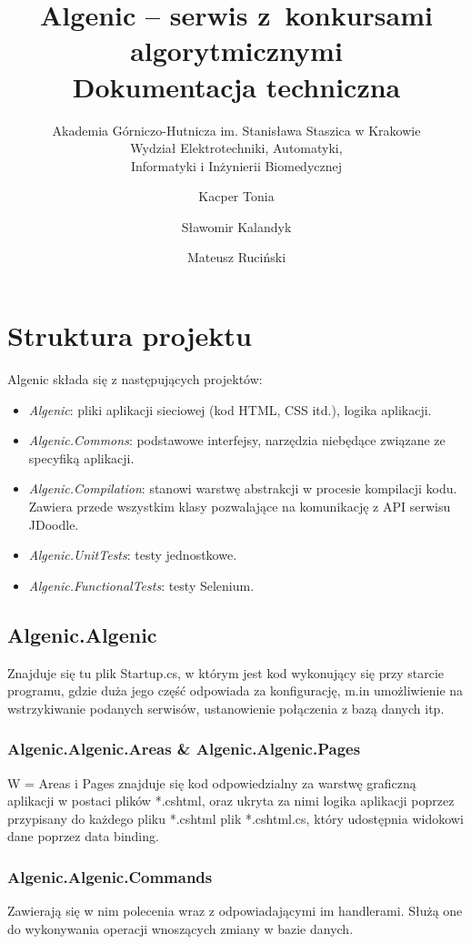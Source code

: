 \documentclass{article}
\title{Algenic -- serwis z~konkursami algorytmicznymi\\
    Dokumentacja techniczna}
\subtitle{Akademia Górniczo-Hutnicza im. Stanisława Staszica w Krakowie\\
	Wydział Elektrotechniki, Automatyki,\\
	Informatyki i Inżynierii Biomedycznej}
\author{Kacper Tonia\and
		Sławomir Kalandyk\and
		Mateusz Ruciński}
\date{}
\begin{document}
\maketitle

\section{Struktura projektu}
Algenic składa się z następujących projektów:
\begin{itemize}
    \item \textit{Algenic}: pliki aplikacji sieciowej (kod HTML, CSS itd.), logika aplikacji.
    \item \textit{Algenic.Commons}: podstawowe interfejsy, narzędzia niebędące związane ze specyfiką aplikacji.
    \item \textit{Algenic.Compilation}: stanowi warstwę abstrakcji w procesie kompilacji kodu. Zawiera przede wszystkim klasy pozwalające na komunikację z API serwisu JDoodle.
    \item \textit{Algenic.UnitTests}: testy jednostkowe.
    \item \textit{Algenic.FunctionalTests}: testy Selenium.
\end{itemize}
\subsection{Algenic.Algenic}
Znajduje się tu plik Startup.cs, w którym jest kod wykonujący się przy starcie programu, gdzie duża jego część odpowiada za konfigurację, m.in umożliwienie na wstrzykiwanie podanych serwisów, ustanowienie połączenia z bazą danych itp.
\subsubsection{Algenic.Algenic.Areas \& Algenic.Algenic.Pages}
W = Areas i Pages znajduje się kod odpowiedzialny za warstwę graficzną aplikacji w postaci plików *.cshtml, oraz ukryta za nimi logika aplikacji poprzez przypisany do każdego pliku *.cshtml plik *.cshtml.cs, który udostępnia widokowi dane poprzez data binding.
\subsubsection{Algenic.Algenic.Commands}
Zawierają się w nim polecenia wraz z odpowiadającymi im handlerami. Służą one do wykonywania operacji wnoszących zmiany w bazie danych.
\end{document}
